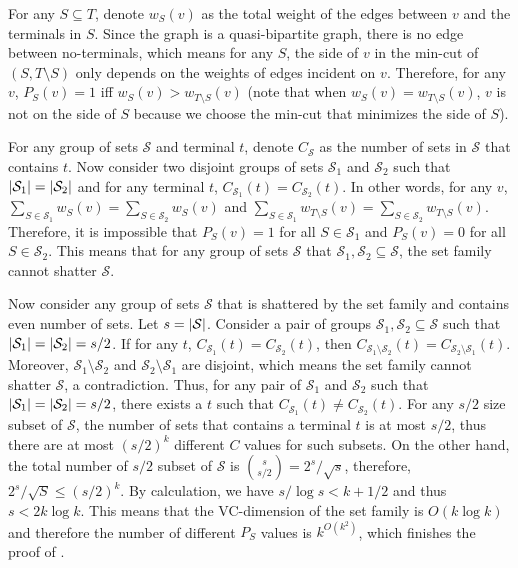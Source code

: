 For any $S \subseteq T$, denote $w_S(v)$ as the total weight of the edges between $v$ and the terminals in $S$. Since the graph is a quasi-bipartite graph, there is no edge between no-terminals, which means for any $S$, the side of $v$ in the min-cut of $(S,T \setminus S)$ only depends on the weights of edges incident on $v$. Therefore, for any $v$, $P_S(v)=1$ iff $w_S(v) > w_{T \setminus S}(v)$ (note that when $w_S(v) = w_{T \setminus S}(v)$, $v$ is not on the side of $S$ because we choose the min-cut that minimizes the side of $S$). 

For any group of sets $\mathcal{S}$ and terminal $t$, denote $C_{\mathcal{S}}$ as the number of sets in $\mathcal{S}$ that contains $t$. Now consider two disjoint groups of sets $\mathcal{S}_1$ and $\mathcal{S}_2$ such that $\left| \mathcal{S}_1 \right| = \left| \mathcal{S}_2 \right|$ and for any terminal $t$, $C_{\mathcal{S}_1}(t)=C_{\mathcal{S}_2}(t)$. In other words, for any $v$, $\sum_{S\in \mathcal{S}_1} w_{S}(v) = \sum_{S \in \mathcal{S}_2} w_{S}(v)$ and $\sum_{S \in \mathcal{S}_1} w_{T \setminus S}(v) = \sum_{S \in \mathcal{S}_2} w_{T \setminus S}(v)$. Therefore, it is impossible that $P_{S}(v)=1$ for all $S \in \mathcal{S}_1$ and $P_{S}(v)=0$ for all $S \in \mathcal{S}_2$. This means that for any group of sets $\mathcal{S}$ that $\mathcal{S}_1,\mathcal{S}_2 \subseteq \mathcal{S}$, the set family cannot shatter $\mathcal{S}$.

Now consider any group of sets $\mathcal{S}$ that is shattered by the set family and contains even number of sets. Let $s=\left| \mathcal{S} \right|$. Consider a pair of groups $\mathcal{S}_1,\mathcal{S}_2 \subseteq \mathcal{S}$ such that $\left| \mathcal{S}_1 \right| = \left| \mathcal{S}_2 \right| = s/2$. If for any $t$, $C_{\mathcal{S}_1}(t) = C_{\mathcal{S}_2}(t)$, then $C_{\mathcal{S}_1 \setminus \mathcal{S}_2}(t) = C_{\mathcal{S}_2 \setminus \mathcal{S}_1}(t)$. Moreover, $\mathcal{S}_1 \setminus \mathcal{S}_2$ and $\mathcal{S}_2 \setminus \mathcal{S}_1$ are disjoint, which means the set family cannot shatter $\mathcal{S}$, a contradiction. Thus, for any pair of $\mathcal{S}_1$ and $\mathcal{S}_2$ such that $\left| \mathcal{S}_1 \right| = \left| \mathcal{S}_2 \right| = s/2$, there exists a $t$ such that $C_{\mathcal{S}_1}(t) \neq C_{\mathcal{S}_2}(t)$. For any $s/2$ size subset of $\mathcal{S}$, the number of sets that contains a terminal $t$ is at most $s/2$, thus there are at most $(s/2)^k$ different $C$ values for such subsets. On the other hand, the total number of $s/2$ subset of $\mathcal{S}$ is $\binom{s}{s/2} = 2^s/\sqrt{s}$, therefore, $2^s/\sqrt{S} \le (s/2)^k$. By calculation, we have $s/\log s < k + 1/2$ and thus $s < 2 k \log k$. This means that the VC-dimension of the set family is $O(k \log k)$ and therefore the number of different $P_S$ values is $k^{O(k^2)}$, which finishes the proof of .
\fi